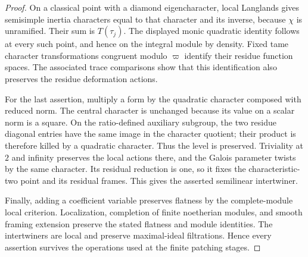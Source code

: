 \begin{proof}
On a classical point with a diamond eigencharacter,
local Langlands gives semisimple inertia characters
equal to that character and its inverse, because
\(\chi\) is unramified. Their sum is \(T(\tau_j)\).
The displayed monic quadratic identity follows at
every such point, and hence on the integral module
by density. Fixed tame character transformations
congruent modulo \(\varpi\) identify their residue
function spaces. The associated trace comparisons
show that this identification also preserves the
residue deformation actions.

For the last assertion, multiply a form by the
quadratic character composed with reduced norm.
The central character is unchanged because its value
on a scalar norm is a square. On the ratio-defined
auxiliary subgroup, the two residue diagonal entries
have the same image in the character quotient; their
product is therefore killed by a quadratic character.
Thus the level is preserved. Triviality at \(2\) and
infinity preserves the local actions there, and the
Galois parameter twists by the same character.
Its residual reduction is one, so it fixes the
characteristic-two point and its residual frames.
This gives the asserted semilinear intertwiner.

Finally, adding a coefficient variable preserves
flatness by the complete-module local criterion.
Localization, completion of finite noetherian
modules, and smooth framing extension preserve the
stated flatness and module identities. The
intertwiners are local and preserve maximal-ideal
filtrations. Hence every assertion survives the
operations used at the finite patching stages.
\end{proof}

